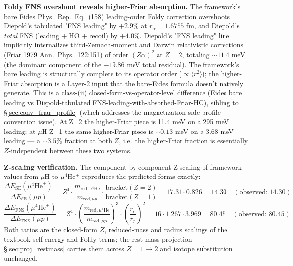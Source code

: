 \documentclass[11pt]{article}
\begin{document}
\textbf{Foldy FNS overshoot reveals higher-Friar absorption.}  The
framework's bare Eides Phys.\ Rep.\ Eq.~(158) leading-order Foldy correction
overshoots Diepold's tabulated "FNS leading" by $+2.9\%$ at $r_\alpha = 1.6755$
fm, and Diepold's \emph{total} FNS (leading $+$ HO $+$ recoil) by
$+4.0\%$.  Diepold's "FNS leading" line implicitly internalizes
third-Zemach-moment and Darwin relativistic corrections (Friar 1979
Ann.\ Phys.\ 122:151) of order $(Z\alpha)^2$ at $Z=2$, totaling
$\sim 11.4$ meV (the dominant component of the $-19.86$ meV total
residual).  The framework's bare leading is structurally complete to
its operator order ($\propto \langle r^2 \rangle$); the higher-Friar
absorption is a Layer-2 input that the bare-Eides formula doesn't
natively generate.  This is a class-(ii) closed-form-vs-operator-level
difference (Eides bare leading vs
Diepold-tabulated FNS-leading-with-absorbed-Friar-HO), sibling to
\S\ref{sec:conv_friar_profile} (which addresses the magnetization-side
profile-convention issue).  At Z=2 the higher-Friar piece is 11.4 meV
on a 295 meV leading; at $\mu$H Z=1 the same higher-Friar piece is
$\sim 0.13$ meV on a 3.68 meV leading --- a $\sim 3.5\%$ fraction at
both $Z$, i.e.\ the higher-Friar fraction is essentially
$Z$-independent between these two systems.

\textbf{Z-scaling verification.}  The component-by-component Z-scaling
of framework values from $\mu$H to $\mu^4$He$^+$ reproduces the
predicted forms exactly:
\begin{equation}
\frac{\Delta E_\text{SE}(\mu^4\text{He}^+)}{\Delta E_\text{SE}(\mu p)}
= Z^4 \cdot \frac{m_{\text{red},\mu^4\text{He}}}{m_{\text{red},\mu p}}
  \cdot \frac{\text{bracket}(Z=2)}{\text{bracket}(Z=1)}
= 17.31 \cdot 0.826 = 14.30 \quad (\text{observed: } 14.30)
\end{equation}
\begin{equation}
\frac{\Delta E_\text{FNS}(\mu^4\text{He}^+)}{\Delta E_\text{FNS}(\mu p)}
= Z^4 \cdot \left(\frac{m_{\text{red},\mu^4\text{He}}}{m_{\text{red},\mu p}}\right)^3
  \cdot \left(\frac{r_\alpha}{r_p}\right)^2
= 16 \cdot 1.267 \cdot 3.969 = 80.45 \quad (\text{observed: } 80.45)
\end{equation}
Both ratios are the closed-form $Z$, reduced-mass and radius scalings of
the textbook self-energy and Foldy terms; the rest-mass projection
\S\ref{sec:proj_restmass} carries them across $Z = 1 \to 2$ and isotope
substitution unchanged.
\end{document}

